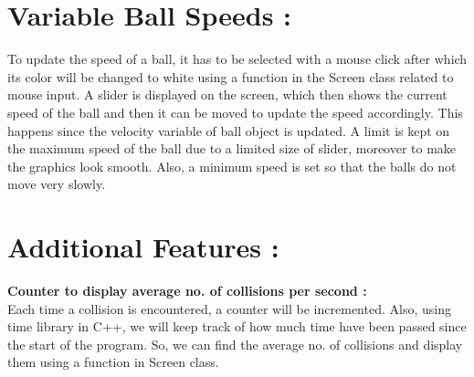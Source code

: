 \documentclass[]{article}
\begin{document}
\section{\LARGE Variable Ball Speeds :}
\Large To update the speed of a ball, it has to be selected with a mouse click after which its color will be changed to white using a function in the Screen class related to mouse input. A slider is displayed on the screen, which then shows the current speed of the ball and then it can be moved to update the speed accordingly. This happens since the velocity variable of ball object is updated. A limit is kept on the maximum speed of the ball due to a limited size of slider, moreover to make the graphics look smooth. Also, a minimum speed is set so that the balls do not move very slowly.

\section{\LARGE Additional Features :}
\Large\textbf{Counter to display average no. of collisions per second :}\\
Each time a collision is encountered, a counter will be incremented. Also, using time library in C++, we will keep track of how much time have been passed since the start of the program. So, we can find the average no. of collisions and display them using a function in Screen class.
\end{document}
